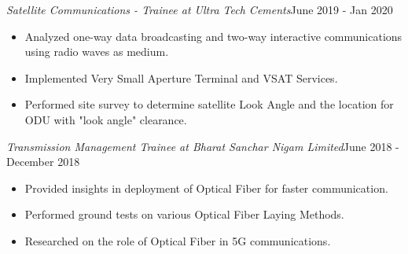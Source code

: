 \documentclass[resmargin, 10pt]{res} %
\begin{document}
\begin{resume}
{\sl Satellite Communications - Trainee at Ultra Tech Cements}\hfill June 2019 - Jan 2020
\vspace{1.2em}
\begin{itemize}\itemsep -2pt
\item Analyzed one-way data broadcasting and two-way interactive communications using radio waves as medium.
\item Implemented Very Small Aperture Terminal and VSAT Services.
\item Performed site survey to determine satellite Look Angle and the location for ODU with "look angle" clearance.

\end{itemize} 

{\sl Transmission Management Trainee at Bharat Sanchar Nigam Limited}\hfill June 2018 - December 2018
\vspace{1.2em}
\begin{itemize}\itemsep -2pt
\item Provided insights in deployment of Optical Fiber for faster communication.
\item Performed ground tests on various Optical Fiber Laying Methods.
\item Researched on the role of Optical Fiber in 5G communications. 
\end{itemize} 







\end{resume}
\end{document}
